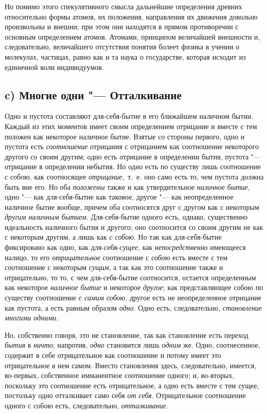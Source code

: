 Но помимо этого спекулятивного смысла дальнейшие определения древних
относительно формы атомов, их положения, направления их движения довольно
произвольны и внешни; при этом они находятся в прямом противоречии с
основным определением атомов. Атомами, принципом величайшей внешности и,
следовательно, величайшего отсутствия понятия болеет физика в учении о
молекулах, частицах, равно как и та наука о государстве, которая исходит из
единичной воли индивидуумов.

\subsection*{c) Многие одни "--- Отталкивание}
Одно и пустота составляют для-себя-бытие в его ближайшем наличном бытии.
Каждый из этих моментов имеет своим определением отрицание и вместе с тем
положен как некоторое наличное бытие. Взятые со стороны первого, одно и
пустота есть {\em соотношение} отрицания с отрицанием
как соотношение некоторого другого со своим другим; одно есть отрицание в
определении бытия, пустота "--- отрицание в определении небытия. Но одно есть
по существу лишь соотношение с собою, как соотносящее
{\em отрицание},~т.~е. оно само есть то, чем пустота
должна быть вне его. Но оба {\em положены} также и как
утвердительное {\em наличное бытие}, одно "--- как
для-себя-бытие как таковое, другое "--- как неопределенное наличное бытие
вообще, причем оба соотносятся друг с другом как с некоторым
{\em другим наличным бытием}. Для-себя-бытие одного
есть, однако, существенно идеальность наличного бытия и другого; оно
соотносится со своим другим не как с некоторым другим, а лишь как
{\em с собою}. Но так как для-себя-бытие фиксировано
как одно, как для-себя-{\em сущее}, как
{\em непосредственно} имеющееся налицо, то его
{\em отрицательное} соотношение с
{\em собою} есть вместе с тем соотношение с некоторым
{\em сущим}, а так как это соотношение также и
отрицательно, то то, с чем для-себя-бытие соотносится, остается
определенным как некоторое {\em наличное бытие} и
некоторое {\em другое}; как представляющее собою по
существу соотношение {\em с самим собою}, другое есть
не неопределенное отрицание как пустота, а есть равным образом
{\em одно}. Одно есть, следовательно,
{\em становление многими одними}.

Но, собственно говоря, это не становление, так как становление есть переход
{\em бытия} в {\em ничто};
напротив, {\em одно} становится лишь
{\em одним} же. Одно, соотнесенное, содержит в себе
отрицательное как соотношение и потому имеет это отрицательное
{\em в} нем самом. Вместо становления здесь,
следовательно, имеется, во-первых, собственное имманентное соотношение
одного; и, во-вторых, поскольку это соотношение есть отрицательное, а одно
есть вместе с тем сущее, постольку одно отталкивает само себя
{\em от себя}. Отрицательное соотношение одного с собою
есть, следовательно, {\em отталкивание}.

